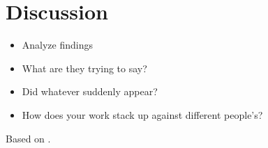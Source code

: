 \chapter{Discussion}
    \begin{itemize}
        \item Analyze findings
        \item What are they trying to say?
        \item Did whatever suddenly appear?
        \item How does your work stack up against different people's?
    \end{itemize}
    Based on \cite{AssignmentExpert2026}.